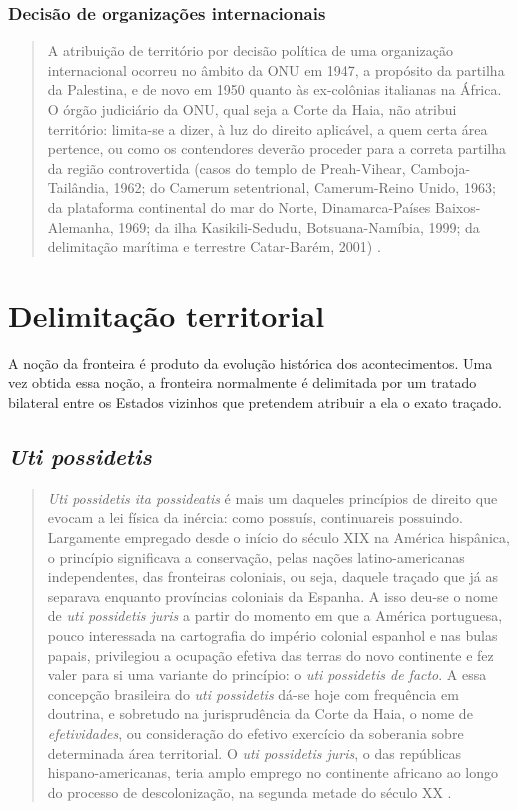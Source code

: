 \documentclass{article}
\begin{document}
\subsubsection{Decisão de organizações internacionais}

\begin{quote}
    A atribuição de território por decisão política de uma organização internacional ocorreu no âmbito da ONU em 1947, a propósito da partilha da Palestina, e de novo em 1950 quanto às ex-colônias italianas na África. O órgão judiciário da ONU, qual seja a Corte da Haia, não atribui território: limita-se a dizer, à luz do direito aplicável, a quem certa área pertence, ou como os conten­dores deverão proceder para a correta partilha da região controvertida (casos do templo de Preah-Vihear, Camboja-Tailândia, 1962; do Camerum setentrional, Camerum-Reino Unido, 1963; da plataforma continental do mar do Norte, Dinamarca-Países Baixos-Alemanha, 1969; da ilha Kasikili-Sedudu, Botsuana-Namíbia, 1999; da delimitação marítima e terrestre Catar-Barém, 2001)  \cite[p.~73]{rezek_direito_2024}.
\end{quote}

\section{Delimitação territorial}

A noção da fronteira é produto da evolução histórica dos acontecimentos. Uma vez obtida essa noção, a fronteira normalmente é delimitada por um tratado bilateral entre os Estados vizinhos que pretendem atribuir a ela o exato traçado.

\subsection{\textit{Uti possidetis}}

\begin{quote}
    \textit{Uti possidetis ita possideatis} é mais um daqueles princípios de direito que evocam a lei física da inércia: como possuís, continuareis possuindo. Largamente empregado desde o início do século XIX na América hispânica, o princípio significava a conservação, pelas nações latino-americanas independentes, das fronteiras coloniais, ou seja, daquele traçado que já as separava enquanto províncias coloniais da Espanha. A isso deu-se o nome de \textit{uti possidetis juris} a partir do momento em que a América portuguesa, pouco interessada na cartografia do império colonial espanhol e nas bulas papais, privilegiou a ocupação efetiva das terras do novo continente e fez valer para si uma variante do princípio: o \textit{uti possidetis de facto}. A essa concepção brasileira do \textit{uti possidetis} dá-se hoje com frequência em doutrina, e sobretudo na jurisprudência da Corte da Haia, o nome de \textit{efetividades}, ou consideração do efetivo exercício da soberania sobre determinada área territorial. O \textit{uti possidetis juris}, o das repúblicas hispano-americanas, teria amplo emprego no continente africano ao longo do processo de descolonização, na segunda metade do século XX \cite[p.~74]{rezek_direito_2024}.
\end{quote}  
\end{document}
